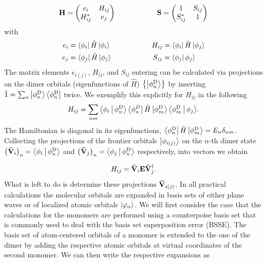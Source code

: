 %
\begin{equation}
  \mathbf{ H } = 
  \begin{pmatrix}
    e_i    &  H_{ij} \\
    H_{ij}^* &  e_j  
  \end{pmatrix} \hspace{2cm}
  \mathbf{ S } = 
  \begin{pmatrix}
    1    &  S_{ij} \\
    S_{ij}^* &  1  
  \end{pmatrix}
  \label{equ:dipro_eq3}
\end{equation}
%
with 
%
\begin{equation}
 \begin{aligned}
  e_i &= \Bra{\phi_i}\oper{H} \Ket{\phi_i} \hspace{2cm}  H_{ij} = \Bra{\phi_i}\oper{H} \Ket{\phi_j}\\
  e_j &= \Bra{\phi_j}\oper{H} \Ket{\phi_j} \hspace{2cm}  S_{ij} = \Bra{\phi_j} \phi_j\rangle %
 \end{aligned}
  \label{equ:dipro_eq4}
\end{equation}
The matrix elements $e_{i(j)}$, $H_{ij}$, and $S_{ij}$ entering  can be calculated via projections on the dimer orbitals (eigenfunctions of $\hat{H}$) $\left\{\Ket{\phi^\text{D}_n}\right\}$ by inserting $\hat{ 1 } = \sum_n \Ket{\phi^\text{D}_n}\Bra{\phi^\text{D}_n}$ twice. We exemplify this explicitly for $H_{ij}$ in the following
%
\begin{equation}
  H_{ij} = \sum_{nm}{\Braket{\phi_i|\phi^\text{D}_n} \Bra{\phi^{D}_n}\hat{H}\Ket{\phi^\text{D}_m}\Braket{\phi^\text{D}_m|\phi_j}} .
  \label{eq:dipro_eq16}
\end{equation}
%
The Hamiltonian is diagonal in its eigenfunctions, $\Bra{\phi^\text{D}_n}\hat{ H }\Ket{\phi^\text{D}_m} = E_n \delta_{nm}$. Collecting the projections of the frontier orbitals  $\Ket{\phi_{i(j)}}$ on the $n$-th dimer state $\left(\mathbf{ \bar{V} }_i\right)_n= \Braket{\phi_i|\phi^\text{D}_n}$ and $\left(\mathbf{ \bar{V} }_j\right)_n=\Braket{\phi_j|\phi^\text{D}_n}$ respectively, into vectors we obtain

\begin{equation}
   H_{ij} = \mathbf{ \bar{V} }_i \mathbf{ E }   \mathbf{ \bar{V} }_j^\dagger .
  \label{eq:dipro_eq17}
\end{equation}
%
What is left to do is determine these projections $\mathbf{ \bar{V} }_{i(j)}$. In all practical calculations the molecular orbitals are expanded in basis sets of either plane waves or of localized atomic orbitals $\Ket{\varphi_\alpha}$. We will first consider the case that the calculations for
the monomers are performed using a counterpoise basis set that is commonly used to deal with the basis set superposition error (BSSE). The basis set of atom-centered orbitals of a monomer is extended to the one of the dimer by adding the respective atomic orbitals at virtual coordinates of the second monomer. We can then write the respective expansions as

